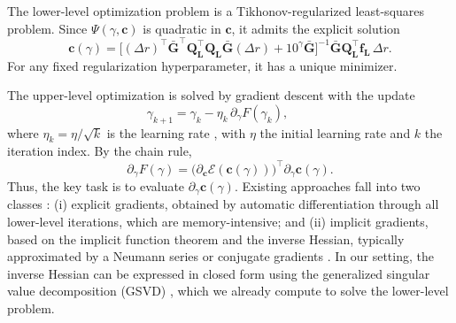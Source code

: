 \documentclass[12pt]{article}
\numberwithin{equation}{section}
\numberwithin{theorem}{section}
\begin{document}
The lower-level optimization problem is a Tikhonov-regularized least-squares problem. 
Since \(\Psi(\gamma,\mathbf{c})\) is quadratic in \(\mathbf{c}\), it admits the explicit solution
\begin{equation}
\label{eq:LLOP}
\mathbf{c}(\gamma)
= \big[(\Delta r)^{\top}\bar{\mathbf{G}}^{\top}\mathbf{Q}_{\mathbf{L}}^{\top}\mathbf{Q}_{\mathbf{L}}\bar{\mathbf{G}}(\Delta r)
+ 10^{\gamma}\bar{\mathbf{G}}\big]^{-1}\bar{\mathbf{G}}\mathbf{Q}_{\mathbf{L}}^{\top}\mathbf{f}_{\mathbf{L}}\,\Delta r .
\end{equation}
For any fixed regularization hyperparameter, it has a unique minimizer.

The upper-level optimization is solved by gradient descent with the update
\begin{equation}
\label{eq:gradient}
\gamma_{k+1}=\gamma_k-\eta_k\,\partial_\gamma F(\gamma_k),
\qquad 
\end{equation}
where $\eta_k= \eta/\sqrt{k}$ is the learning rate \cite{kingma2014adam}, with $\eta$ the initial learning rate and $k$ the iteration index.
By the chain rule,
\begin{equation}
\label{eq:chain}
\partial_\gamma F(\gamma)=\big(\partial_{\mathbf{c}}\mathcal{E}(\mathbf{c}(\gamma))\big)^{\top}\partial_\gamma \mathbf{c}(\gamma).
\end{equation}
Thus, the key task is to evaluate $\partial_\gamma \mathbf{c}(\gamma)$. Existing approaches fall into two classes \cite{liu2021investigating}: (i) explicit gradients, obtained by automatic differentiation through all lower-level iterations, which are memory-intensive; and (ii) implicit gradients, based on the implicit function theorem and the inverse Hessian, typically approximated by a Neumann series \cite{lorraine2020optimizing} or conjugate gradients \cite{rajeswaran2019meta}. In our setting, the inverse Hessian can be expressed in closed form using the generalized singular value decomposition (GSVD) \cite{hansen1994regularization}, which we already compute to solve the lower-level problem.
\end{document}
